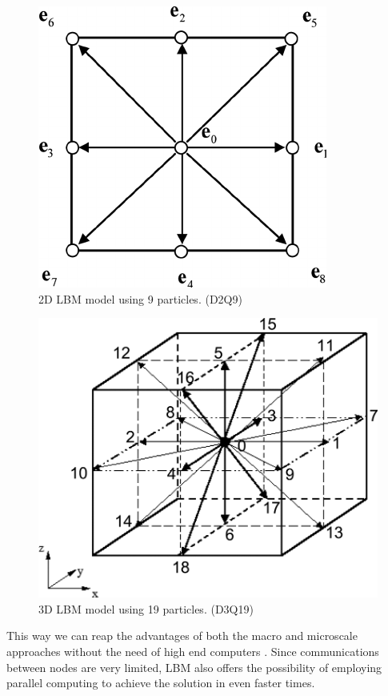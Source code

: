 \documentclass[12pt]{book}
\begin{document}
\begin{figure}[H]
\centering
  \includegraphics[width=0.3\linewidth]{Resources/Images/d2q9.png}
  \caption{2D LBM model using 9 particles. (D2Q9)}
  \label{fig:d2q9}
\end{figure}

\begin{figure}[H]
\centering
  \includegraphics[width=0.3\linewidth]{Resources/Images/d3q19.png}
  \caption{3D LBM model using 19 particles. (D3Q19)}
  \label{fig:d3q19}
\end{figure}

\par
This way we can reap the advantages of both the macro and microscale approaches without the need of high end computers \cite{lbm_springer}. Since communications between nodes are very limited, LBM also offers the possibility of employing parallel computing to achieve the solution in even faster times.
\end{document}
